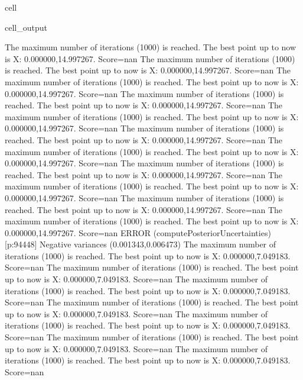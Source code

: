 \documentclass[letterpaper,10pt,english]{jupyterBook}
\begin{document}
\begin{sphinxuseclass}{cell}
\begin{sphinxVerbatimOutput}
\begin{sphinxuseclass}{cell_output}
\begin{sphinxVerbatim}[commandchars=\\\{\}]
The maximum number of iterations (1000) is reached. The best point up to now is X: \PYGZob{}0.000000,14.997267\PYGZcb{}. Score=\PYGZhy{}nan
The maximum number of iterations (1000) is reached. The best point up to now is X: \PYGZob{}0.000000,14.997267\PYGZcb{}. Score=\PYGZhy{}nan
The maximum number of iterations (1000) is reached. The best point up to now is X: \PYGZob{}0.000000,14.997267\PYGZcb{}. Score=\PYGZhy{}nan
The maximum number of iterations (1000) is reached. The best point up to now is X: \PYGZob{}0.000000,14.997267\PYGZcb{}. Score=\PYGZhy{}nan
The maximum number of iterations (1000) is reached. The best point up to now is X: \PYGZob{}0.000000,14.997267\PYGZcb{}. Score=\PYGZhy{}nan
The maximum number of iterations (1000) is reached. The best point up to now is X: \PYGZob{}0.000000,14.997267\PYGZcb{}. Score=\PYGZhy{}nan
The maximum number of iterations (1000) is reached. The best point up to now is X: \PYGZob{}0.000000,14.997267\PYGZcb{}. Score=\PYGZhy{}nan
The maximum number of iterations (1000) is reached. The best point up to now is X: \PYGZob{}0.000000,14.997267\PYGZcb{}. Score=\PYGZhy{}nan
The maximum number of iterations (1000) is reached. The best point up to now is X: \PYGZob{}0.000000,14.997267\PYGZcb{}. Score=\PYGZhy{}nan
The maximum number of iterations (1000) is reached. The best point up to now is X: \PYGZob{}0.000000,14.997267\PYGZcb{}. Score=\PYGZhy{}nan
The maximum number of iterations (1000) is reached. The best point up to now is X: \PYGZob{}0.000000,14.997267\PYGZcb{}. Score=\PYGZhy{}nan
ERROR (compute\PYGZus{}Posterior\PYGZus{}Uncertainties) [p:94448] Negative variances (\PYGZhy{}0.001343,0.006473)
The maximum number of iterations (1000) is reached. The best point up to now is X: \PYGZob{}0.000000,7.049183\PYGZcb{}. Score=\PYGZhy{}nan
The maximum number of iterations (1000) is reached. The best point up to now is X: \PYGZob{}0.000000,7.049183\PYGZcb{}. Score=\PYGZhy{}nan
The maximum number of iterations (1000) is reached. The best point up to now is X: \PYGZob{}0.000000,7.049183\PYGZcb{}. Score=\PYGZhy{}nan
The maximum number of iterations (1000) is reached. The best point up to now is X: \PYGZob{}0.000000,7.049183\PYGZcb{}. Score=\PYGZhy{}nan
The maximum number of iterations (1000) is reached. The best point up to now is X: \PYGZob{}0.000000,7.049183\PYGZcb{}. Score=\PYGZhy{}nan
The maximum number of iterations (1000) is reached. The best point up to now is X: \PYGZob{}0.000000,7.049183\PYGZcb{}. Score=\PYGZhy{}nan
The maximum number of iterations (1000) is reached. The best point up to now is X: \PYGZob{}0.000000,7.049183\PYGZcb{}. Score=\PYGZhy{}nan

\end{sphinxVerbatim}
\end{sphinxuseclass}
\end{sphinxVerbatimOutput}
\end{sphinxuseclass}
\end{document}
